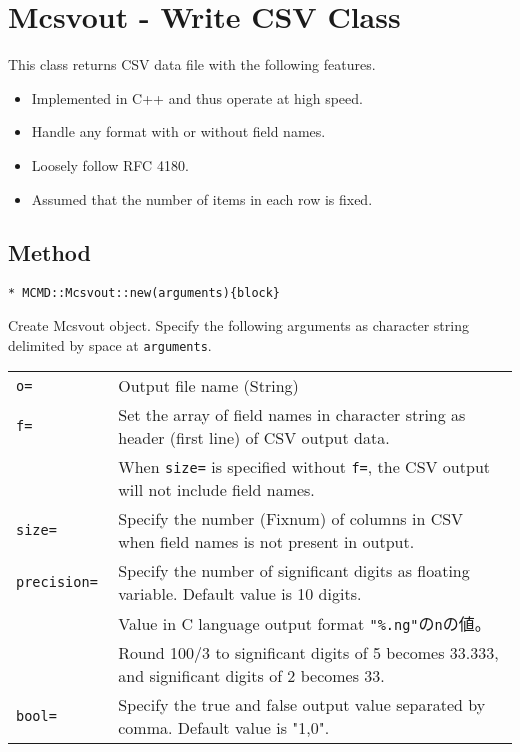 
%

\section{Mcsvout - Write CSV Class \label{sect:mcsvoutRB}}
This class returns CSV data file with the following features. 

\begin{itemize}
\item Implemented in C++ and thus operate at high speed.
\item Handle any format with or without field names.
\item Loosely follow RFC 4180.
\item Assumed that the number of items in each row is fixed.
\end{itemize}

 
\subsection{Method}

{\Large
\begin{verbatim}
* MCMD::Mcsvout::new(arguments){block}
\end{verbatim}
}

Create Mcsvout object.  Specify the following arguments as character string delimited by space at \verb|arguments|. 

\begin{table}[htbp]
\begin{tabular}{ll}
\verb|o=|    & Output file name (String)\\
\verb|f=|    & Set the array of field names in character string as header (first line) of CSV output data. \\
             &  When \verb/size=/ is specified without \verb|f=|, the CSV output will not include field names.\\
\verb|size=| & Specify the number (Fixnum) of columns in CSV when field names is not present in output. \\
\verb|precision= | & Specify the number of significant digits as floating variable. Default value is 10 digits. \\
                   & Value in C language output format \verb/"%.ng"/の\verb|n|の値。\\
                   & Round 100/3 to significant digits of 5 becomes 33.333, and significant digits of 2 becomes 33. \\
\verb|bool=| & Specify the true and false output value separated by comma. Default value is "1,0".\\
\end{tabular} 
\end{table} 

